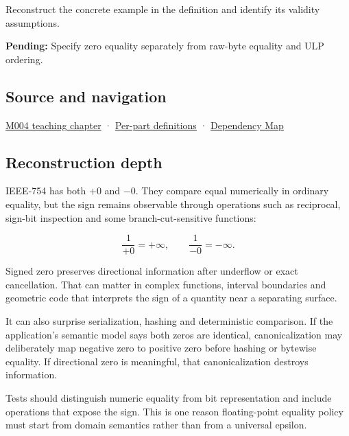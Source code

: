 Reconstruct the concrete example in the definition and identify its validity assumptions.

\textbf{Pending:} Specify zero equality separately from raw-byte equality and ULP ordering.

\subsection{Source and navigation}\label{appendix-3a048f032c1f-source-and-navigation}

\hyperref[01-foundations-i-ch001-a-stretching-ruler-for-real-valued-quantities]{M004 teaching chapter} · \hyperref[appendix-fd090d982a15-m004---parts-61-76]{Per-part definitions} · \hyperref[appendix-4ad47bdd269a]{Dependency Map}

\subsection{Reconstruction depth}\label{appendix-3a048f032c1f-reconstruction-depth}

IEEE-754 has both \(+0\) and \(-0\). They compare equal numerically in ordinary equality, but the sign remains observable through operations such as reciprocal, sign-bit inspection and some branch-cut-sensitive functions:

\[
\frac{1}{+0}=+\infty,
\qquad
\frac{1}{-0}=-\infty.
\]

Signed zero preserves directional information after underflow or exact cancellation. That can matter in complex functions, interval boundaries and geometric code that interprets the sign of a quantity near a separating surface.

It can also surprise serialization, hashing and deterministic comparison. If the application's semantic model says both zeros are identical, canonicalization may deliberately map negative zero to positive zero before hashing or bytewise equality. If directional zero is meaningful, that canonicalization destroys information.

Tests should distinguish numeric equality from bit representation and include operations that expose the sign. This is one reason floating-point equality policy must start from domain semantics rather than from a universal epsilon.
